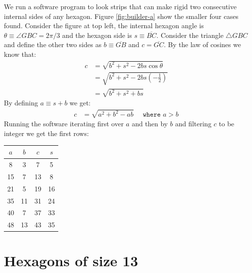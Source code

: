 \documentclass[11pt]{article}
\begin{document}
We run a software program to look strips that can make rigid two consecutive internal sides of any hexagon. Figure \ref{fig:builder-a} show the smaller four cases found. Consider the figure at top left, the internal hexagon angle is $\theta \equiv \angle{GBC} = 2\pi/3$ and the hexagon side is $s \equiv \overline{BC}$. Consider the triangle $\triangle{GBC}$ and define the other two sides as $b \equiv \overline{GB}$ and $c = \overline{GC}$. By the law of cosines we know that:
\begin{align}
c &= \sqrt{b^2 + s^2 - 2bs\cos\theta} \nonumber\\
 &= \sqrt{b^2 + s^2 - 2bs\left(-\frac{1}{2}\right)} \nonumber\\
 &= \sqrt{b^2 + s^2 + bs}
\end{align}
By defining $a \equiv s + b$ we get:
\begin{align}
c &= \sqrt{a^2 + b^2 - ab} \quad \texttt{ where } a > b
\end{align}
Running the software iterating first over $a$ and then by $b$ and filtering $c$ to be integer we get the first rows:
\begin{center}
\begin{tabular}{||c c c c||} 
 \hline
 $a$ & $b$ & $c$ & $s$ \\ [0.5ex] 
 \hline\hline
  8 &  3 &  7 &  5 \\ \hline
 15 &  7 & 13 &  8 \\ \hline
 21 &  5 & 19 & 16 \\ \hline
 35 & 11 & 31 & 24 \\ \hline
 40 &  7 & 37 & 33 \\ \hline
 48 & 13 & 43 & 35 \\ [1ex] 
 \hline
\end{tabular}
\end{center}


\section{Hexagons of size 13}
\end{document}

